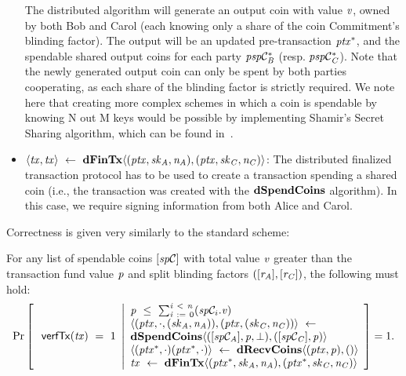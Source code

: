 \begin{definition}
\begin{itemize}
        The distributed algorithm will generate an output coin with value $\mathit{v}$, owned by both Bob and Carol (each knowing only a share of the coin Commitment's blinding factor).
        The output will be an updated pre-transaction $\mathit{ptx}^*$, and the spendable shared output coins for each party $\mathit{psp}\mathcal{C}_{\mathit{B}}^*$ (resp. $\mathit{psp}\mathcal{C}_{\mathit{C}}^*$).
        Note that the newly generated output coin can only be spent by both parties cooperating, as each share of the blinding factor is strictly required.
        We note here that creating more complex schemes in which a coin is spendable by knowing N out M keys would be possible by implementing Shamir's Secret Sharing algorithm, which can be found in~\cite{shamir1979share}.
        \item $\langle \mathit{tx}, \mathit{tx} \rangle ~\leftarrow~ \mathbf{dFinTx} \langle(\mathit{ptx},\mathit{sk}_{\mathit{A}},\mathit{\mathit{n}_{\mathit{A}}}),(\mathit{ptx},\mathit{sk}_{\mathit{C}},\mathit{\mathit{n}_{\mathit{C}}})\rangle$: The distributed finalized transaction protocol has to be used to create a transaction spending a shared coin (i.e., the transaction was created with the $\mathbf{dSpendCoins}$ algorithm).
        In this case, we require signing information from both Alice and Carol.
    \end{itemize}
\end{definition}

Correctness is given very similarly to the standard scheme:

\begin{definition}
    \label{def:atom:ext-tx-scheme-correctness}
    For any list of spendable coins $[\mathit{sp}\mathcal{C}]$ with total value $\mathit{v}$ greater than the transaction fund value $\mathit{p}$ and split blinding factors $([\mathit{r}_{\mathit{A}}], [\mathit{r}_{\mathit{C}}])$, the following must hold:
    \[
        \Pr\left[
        \begin{array}{c}
            \: \mathsf{verfTx}(\mathit{tx}) ~=~ 1
        \end{array}
        \middle\vert
        \begin{array}{l}
            \mathit{p} ~\leq~ \sum_{\mathit{i} ~:=~ 0}^{\mathit{i} ~<~ \mathit{n}}(\mathit{sp}\mathcal{C}_{i}.\mathit{v}) \\
            \langle (\mathit{ptx}, \cdot, (\mathit{sk}_{\mathit{A}}, \mathit{\mathit{n}_{\mathit{A}}})), (\mathit{ptx}, (\mathit{sk}_{\mathit{C}}, \mathit{\mathit{n}_{\mathit{C}}})) \rangle ~\leftarrow~ \\
            \mathbf{dSpendCoins} \langle ([\mathit{sp}\mathcal{C}_{\mathit{A}}],\mathit{p},\bot), ([\mathit{sp}\mathcal{C}_{\mathit{C}}],\mathit{p}) \rangle \\
            \langle (\mathit{ptx}^*, \cdot)(\mathit{ptx}^*, \cdot) \rangle ~\leftarrow~ \mathbf{dRecvCoins} \langle(\mathit{ptx},\mathit{p}), () \rangle \\
            \mathit{tx} ~\leftarrow~ \mathbf{dFinTx} \langle(\mathit{ptx}^*,\mathit{sk}_{\mathit{A}},\mathit{\mathit{n}_{\mathit{A}}}),(\mathit{ptx}^*,\mathit{sk}_{\mathit{C}},\mathit{\mathit{n}_{\mathit{C}}})\rangle
        \end{array}
        \right]=1.
    \]
\end{definition}

